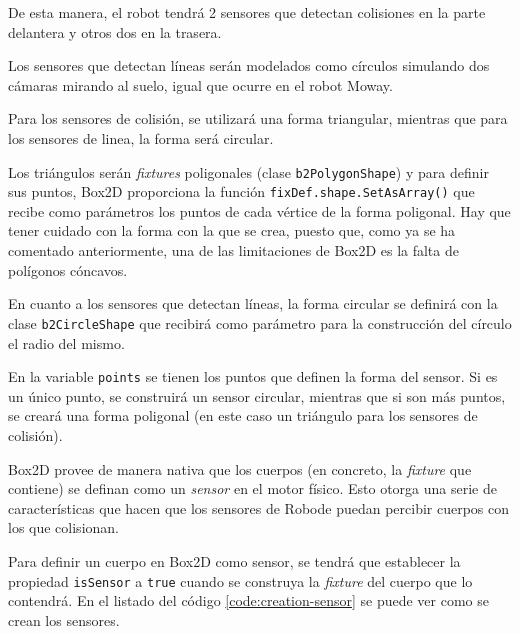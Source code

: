 De esta manera, el robot tendrá 2 sensores que detectan colisiones en la parte delantera y otros dos en la trasera. 


Los sensores que detectan líneas serán modelados como círculos simulando dos cámaras mirando al suelo, igual que ocurre en el robot Moway. 



Para los sensores de colisión, se utilizará una forma triangular, mientras que para los sensores de linea, la forma será circular.

Los triángulos serán \emph{fixtures} poligonales (clase \texttt{b2PolygonShape}) y para definir sus puntos, Box2D proporciona la función \texttt{fixDef.shape.SetAsArray()} que recibe como parámetros los puntos de cada vértice de la forma poligonal. Hay que tener cuidado con la forma con la que se crea, puesto que, como ya se ha comentado anteriormente, una de las limitaciones de Box2D es la falta de polígonos cóncavos. 

En cuanto a los sensores que detectan líneas, la forma circular se definirá con la clase \texttt{b2CircleShape} que recibirá como parámetro para la construcción del círculo el radio del mismo.

En la variable \texttt{points} se tienen los puntos que definen la forma del sensor. Si es un único punto, se construirá un sensor circular, mientras que si son más puntos, se creará una forma poligonal (en este caso un triángulo para los sensores de colisión).


Box2D provee de manera nativa que los cuerpos (en concreto, la \emph{fixture} que contiene) se definan como un \emph{sensor} en el motor físico. Esto otorga una serie de características que hacen que los sensores de Robode puedan percibir cuerpos con los que colisionan. 

Para definir un cuerpo en Box2D como sensor, se tendrá que establecer la propiedad \texttt{isSensor} a \texttt{true} cuando se construya la \emph{fixture} del cuerpo que lo contendrá. En el listado del código \ref{code:creation-sensor} se puede ver como se crean los sensores. 

